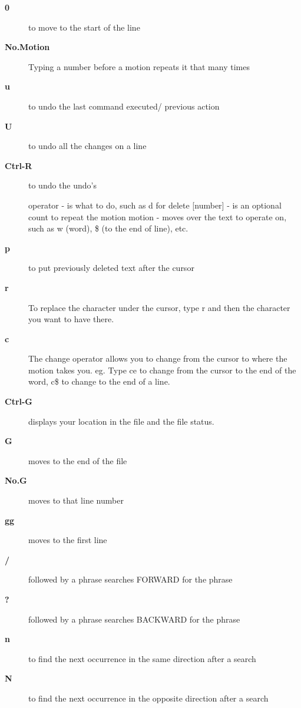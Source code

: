 \documentclass[10pt,a4paper]{scrartcl}
\begin{document}
\begin{description}
\item[\bf{0}] to move to the start of the line

\item[\bf{No.Motion}] Typing a number before a motion repeats it that many times

\item[\bf{u}] to undo the last command executed/ previous action

\item[\bf{U}] to undo all the changes on a line

\item[\bf{Ctrl-R}] to undo the undo's

      operator - is what to do, such as  d  for delete
      [number] - is an optional count to repeat the motion
      motion   - moves over the text to operate on, such as  w (word),
                  \$ (to the end of line), etc.

\item[\bf{p}] to put previously deleted text after the cursor

\item[\bf{r}] To replace the character under the cursor, type   r   and then the
     character you want to have there.

\item[\bf{c}]  The change operator allows you to change from the cursor to where the
     motion takes you.  eg. Type  ce  to change from the cursor to the end of
     the word,  c\$  to change to the end of a line.

\item[\bf{Ctrl-G}] displays your location in the file and the file status.

\item[\bf{G}] moves to the end of the file

\item[\bf{No.G}] moves to that line number

\item[\bf{gg}] moves to the first line

\item[\bf{/}] followed by a phrase searches FORWARD for the phrase

\item[\bf{?}] followed by a phrase searches BACKWARD for the phrase

\item[\bf{n}] to find the next occurrence in the same direction after a search

\item[\bf{N}] to find the next occurrence in the opposite direction after a search


\end{description}
\end{document}
